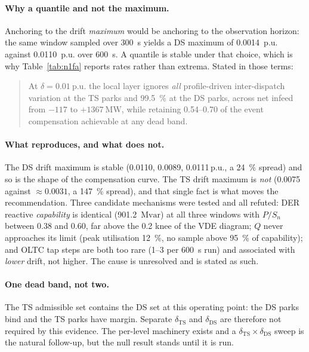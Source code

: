 \documentclass[11pt,a4paper]{article}
\newcommand{\pu}{\ensuremath{\mathrm{p.u.}}}
\newcommand{\Mvar}{\ensuremath{\mathrm{Mvar}}}
\newcommand{\dz}{\ensuremath{\delta}}
\begin{document}
\paragraph{Why a quantile and not the maximum.} Anchoring to the drift
\emph{maximum} would be anchoring to the observation horizon: the same window
sampled over \SI{300}{\second} yields a DS maximum of \SI{0.0014}{\pu} against
\SI{0.0110}{\pu} over \SI{600}{\second}. A quantile is stable under that choice,
which is why Table~\ref{tab:n1fa} reports rates rather than extrema. Stated in
those terms:

\begin{quote}
At $\dz = \SI{0.01}{\pu}$ the local layer ignores \emph{all} profile-driven
inter-dispatch variation at the TS parks and \SI{99.5}{\percent} at the DS parks,
across net infeed from $-117$ to $+\SI{1367}{\mega\watt}$, while retaining
\numrange{0.54}{0.70} of the event compensation achievable at any dead band.
\end{quote}

\paragraph{What reproduces, and what does not.} The DS drift maximum is stable
(\num{0.0110}, \num{0.0089}, \num{0.0111}\,\pu, a \SI{24}{\percent} spread) and
so is the shape of the compensation curve. The TS drift maximum is \emph{not}
(\num{0.0075} against $\approx\!\num{0.0031}$, a \SI{147}{\percent} spread), and
that single fact is what moves the recommendation. Three candidate mechanisms
were tested and all refuted: DER reactive \emph{capability} is identical
(\SI{901.2}{\Mvar}) at all three windows with $P/S_n$ between \num{0.38} and
\num{0.60}, far above the \num{0.2} knee of the VDE diagram; $Q$ never
approaches its limit (peak utilisation \SI{12}{\percent}, no sample above
\SI{95}{\percent} of capability); and OLTC tap steps are both too rare
(\numrange{1}{3} per \SI{600}{\second} run) and associated with \emph{lower}
drift, not higher. The cause is unresolved and is stated as such.

\paragraph{One dead band, not two.} The TS admissible set
contains the DS set at this operating
point: the DS parks bind and the TS parks have margin. Separate $\dz_\mathrm{TS}$
and $\dz_\mathrm{DS}$ are therefore not required by this evidence. The per-level
machinery exists and a $\dz_\mathrm{TS}\!\times\!\dz_\mathrm{DS}$ sweep is the
natural follow-up, but the null result stands until it is run.
\end{document}
